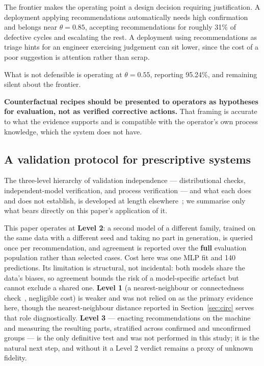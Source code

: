 \documentclass[11pt,a4paper]{article}
\begin{document}
The frontier makes the operating point a design decision requiring justification. A deployment applying recommendations automatically needs high confirmation and belongs near $\theta = 0.85$, accepting recommendations for roughly 31\% of defective cycles and escalating the rest. A deployment using recommendations as triage hints for an engineer exercising judgement can sit lower, since the cost of a poor suggestion is attention rather than scrap.

What is not defensible is operating at $\theta = 0.55$, reporting 95.24\%, and remaining silent about the frontier.

\textbf{Counterfactual recipes should be presented to operators as hypotheses for evaluation, not as verified corrective actions.} That framing is accurate to what the evidence supports and is compatible with the operator's own process knowledge, which the system does not have.

\subsection{A validation protocol for prescriptive systems}

The three-level hierarchy of validation independence --- distributional checks, independent-model verification, and process verification --- and what each does and does not establish, is developed at length elsewhere~\cite{alqawasema2026a}; we summarise only what bears directly on this paper's application of it.

This paper operates at \textbf{Level 2}: a second model of a different family, trained on the same data with a different seed and taking no part in generation, is queried once per recommendation, and agreement is reported over the \textbf{full} evaluation population rather than selected cases. Cost here was one MLP fit and 140 predictions. Its limitation is structural, not incidental: both models share the data's biases, so agreement bounds the risk of a model-specific artefact but cannot exclude a shared one. \textbf{Level 1} (a nearest-neighbour or connectedness check~\cite{keane2021,laugel2019}, negligible cost) is weaker and was not relied on as the primary evidence here, though the nearest-neighbour distance reported in Section~\ref{sec:circ} serves that role diagnostically. \textbf{Level 3} --- enacting recommendations on the machine and measuring the resulting parts, stratified across confirmed and unconfirmed groups --- is the only definitive test and was not performed in this study; it is the natural next step, and without it a Level 2 verdict remains a proxy of unknown fidelity.
\end{document}
